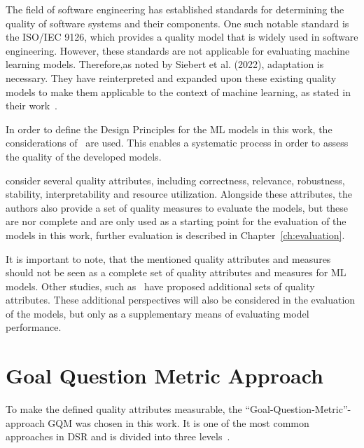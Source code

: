 The field of software engineering has established standards for determining the quality of software systems and their
components.
One such notable standard is the ISO/IEC 9126, which provides a quality model that is widely used in
software engineering.
However, these standards are not applicable for evaluating machine learning models.
Therefore,as noted by Siebert et al. (2022), adaptation is necessary.
They have reinterpreted and expanded upon these existing quality models to make them applicable to the context of
machine learning, as stated in their work~\cite[p. 1]{siebert2022construction}.

In order to define the Design Principles for the \ac{ML} models in this work, the
considerations of~\cite[]{siebert2022construction} are used.
This enables a systematic process in order to assess the quality of the developed models.

\cite{siebert2022construction} consider several quality attributes, including
correctness, relevance, robustness, stability, interpretability and resource utilization.
Alongside these attributes, the authors also provide a set of quality measures to evaluate the
models, but these are nor complete and are only used as a starting point for the evaluation of the
models in this work, further evaluation is described in Chapter~\ref{ch:evaluation}.

It is important to note, that the mentioned quality attributes and measures should
not be seen as a complete set of quality attributes and measures for \ac{ML} models.
Other studies, such as~\cite{zhang2020machine} have proposed additional sets of quality attributes.
These additional perspectives will also be considered in the evaluation of the models, but only
as a supplementary means of evaluating model performance.


\section{Goal Question Metric Approach}\label{subsec:goal-question-metric-approach}
To make the defined quality attributes measurable, the “Goal-Question-Metric”-approach \ac{GQM}
was chosen in this work.
It is one of the most common approaches in DSR and is divided into three levels~\cite[p. 3]{basili_goalquestionmetric_}.

